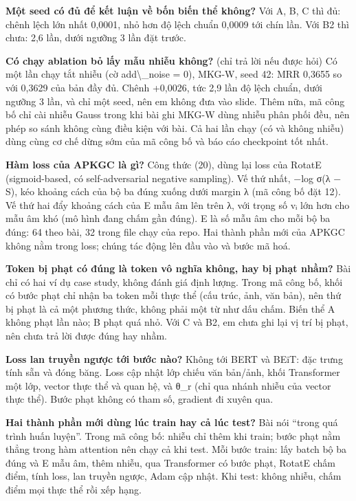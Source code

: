 \documentclass[11pt,a4paper]{article}
\begin{document}
\textbf{Một seed có đủ để kết luận về bốn biến thể không?} Với A, B, C thì đủ: chênh lệch lớn nhất 0,0001, nhỏ hơn độ lệch chuẩn 0,0009 tới chín lần. Với B2 thì chưa: 2,6 lần, dưới ngưỡng 3 lần đặt trước.


\textbf{Có chạy ablation bỏ lấy mẫu nhiễu không?} (chỉ trả lời nếu được hỏi) Có một lần chạy tắt nhiễu (cờ add\textbackslash{}\_noise = 0), MKG-W, seed 42: MRR 0,3655 so với 0,3629 của bản đầy đủ. Chênh +0,0026, tức 2,9 lần độ lệch chuẩn, dưới ngưỡng 3 lần, và chỉ một seed, nên em không đưa vào slide. Thêm nữa, mã công bố chỉ cài nhiễu Gauss trong khi bài ghi MKG-W dùng nhiễu phân phối đều, nên phép so sánh không cùng điều kiện với bài. Cả hai lần chạy (có và không nhiễu) dùng cùng cơ chế dừng sớm của mã công bố và báo cáo checkpoint tốt nhất.


\textbf{Hàm loss của APKGC là gì?} Công thức (20), dùng lại loss của RotatE (sigmoid-based, có self-adversarial negative sampling). Vế thứ nhất, −log σ(λ − S), kéo khoảng cách của bộ ba đúng xuống dưới margin λ (mã công bố đặt 12). Vế thứ hai đẩy khoảng cách của E mẫu âm lên trên λ, với trọng số vᵢ lớn hơn cho mẫu âm khó (mô hình đang chấm gần đúng). E là số mẫu âm cho mỗi bộ ba đúng: 64 theo bài, 32 trong file chạy của repo. Hai thành phần mới của APKGC không nằm trong loss; chúng tác động lên đầu vào và bước mã hoá.


\textbf{Token bị phạt có đúng là token vô nghĩa không, hay bị phạt nhầm?} Bài chỉ có hai ví dụ case study, không đánh giá định lượng. Trong mã công bố, khối có bước phạt chỉ nhận ba token mỗi thực thể (cấu trúc, ảnh, văn bản), nên thứ bị phạt là cả một phương thức, không phải một từ như dấu chấm. Biến thể A không phạt lần nào; B phạt quá nhỏ. Với C và B2, em chưa ghi lại vị trí bị phạt, nên chưa trả lời được đúng hay nhầm.


\textbf{Loss lan truyền ngược tới bước nào?} Không tới BERT và BEiT: đặc trưng tính sẵn và đóng băng. Loss cập nhật lớp chiếu văn bản/ảnh, khối Transformer một lớp, vector thực thể và quan hệ, và θ\_r (chỉ qua nhánh nhiễu của vector thực thể). Bước phạt không có tham số, gradient đi xuyên qua.


\textbf{Hai thành phần mới dùng lúc train hay cả lúc test?} Bài nói ``trong quá trình huấn luyện''. Trong mã công bố: nhiễu chỉ thêm khi train; bước phạt nằm thẳng trong hàm attention nên chạy cả khi test. Mỗi bước train: lấy batch bộ ba đúng và E mẫu âm, thêm nhiễu, qua Transformer có bước phạt, RotatE chấm điểm, tính loss, lan truyền ngược, Adam cập nhật. Khi test: không nhiễu, chấm điểm mọi thực thể rồi xếp hạng.
\end{document}
